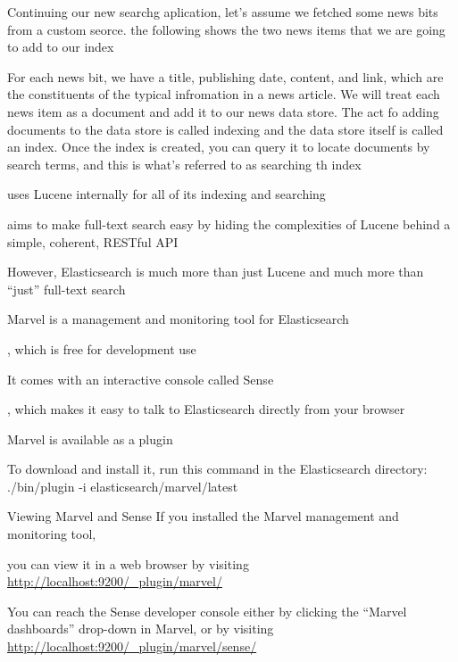 
Continuing our new searchg aplication, let's assume we fetched some news bits from a custom seorce. the following shows the two news items that we are going to add to our index

For each news bit, we have a title, publishing date, content, and link, which are the constituents of the typical infromation in a news article. We will treat each news item as a document and add it to our news data store. The act fo adding documents to the data store is called indexing and the data store itself is called an index. Once the index is created, you can query it to locate documents by search terms, and this is what's referred to as searching th index

uses Lucene internally for all of its indexing and searching

aims to make full-text search easy by hiding the complexities of Lucene behind a simple, coherent, RESTful API

However, Elasticsearch is much more than just Lucene and much more than “just” full-text search

Marvel is a management and monitoring tool for Elasticsearch

, which is free for development use

It comes with an interactive console called Sense

, which makes it easy to talk to Elasticsearch directly from your browser

Marvel is available as a plugin

To download and install it, run this command in the Elasticsearch directory: ./bin/plugin -i elasticsearch/marvel/latest 

Viewing Marvel and Sense If you installed the Marvel management and monitoring tool, 

you can view it in a web browser by visiting \url{http://localhost:9200/_plugin/marvel/}

You can reach the Sense developer console either by clicking the “Marvel dashboards” drop-down in Marvel, or by visiting \url{http://localhost:9200/_plugin/marvel/sense/}
